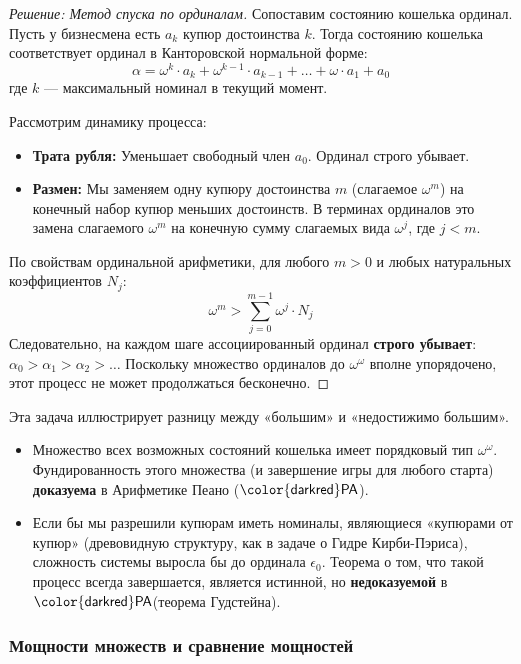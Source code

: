 \documentclass[11pt, a4paper]{extarticle}
\newcommand{\PA}{\ifmmode \mathsf{\color{darkred}PA}\else ${\mathsf{\color{darkred}PA}}$\fi\xspace}
\begin{document}
\begin{proof}[Решение: Метод спуска по ординалам]
Сопоставим состоянию кошелька ординал. Пусть у бизнесмена есть $a_k$ купюр достоинства $k$. Тогда состоянию кошелька соответствует ординал в Канторовской нормальной форме:
$$ \alpha = \omega^{k} \cdot a_k + \omega^{k-1} \cdot a_{k-1} + \dots + \omega \cdot a_1 + a_0 $$
где $k$ — максимальный номинал в текущий момент.

Рассмотрим динамику процесса:
\begin{itemize}
    \item \textbf{Трата рубля:} Уменьшает свободный член $a_0$. Ординал строго убывает.
    \item \textbf{Размен:} Мы заменяем одну купюру достоинства $m$ (слагаемое $\omega^m$) на конечный набор купюр меньших достоинств. В терминах ординалов это замена слагаемого $\omega^m$ на конечную сумму слагаемых вида $\omega^j$, где $j < m$.
\end{itemize}
По свойствам ординальной арифметики, для любого $m > 0$ и любых натуральных коэффициентов $N_j$:
$$ \omega^m > \sum_{j=0}^{m-1} \omega^j \cdot N_j $$
Следовательно, на каждом шаге ассоциированный ординал \textbf{строго убывает}: $\alpha_0 > \alpha_1 > \alpha_2 > \dots$
Поскольку множество ординалов до $\omega^\omega$ вполне упорядочено, этот процесс не может продолжаться бесконечно.
\end{proof}

\begin{remark}
Эта задача иллюстрирует разницу между «большим» и «недостижимо большим».
\begin{itemize}
    \item Множество всех возможных состояний кошелька имеет порядковый тип $\omega^\omega$. Фундированность этого множества (и завершение игры для любого старта) \textbf{доказуема} в Арифметике Пеано (\PA).
    \item Если бы мы разрешили купюрам иметь номиналы, являющиеся «купюрами от купюр» (древовидную структуру, как в задаче о Гидре Кирби-Пэриса), сложность системы выросла бы до ординала $\epsilon_0$. Теорема о том, что такой процесс всегда завершается, является истинной, но \textbf{недоказуемой} в \PA (теорема Гудстейна).
\end{itemize}
\end{remark}


\subsubsection{Мощности множеств и сравнение мощностей}
\end{document}
